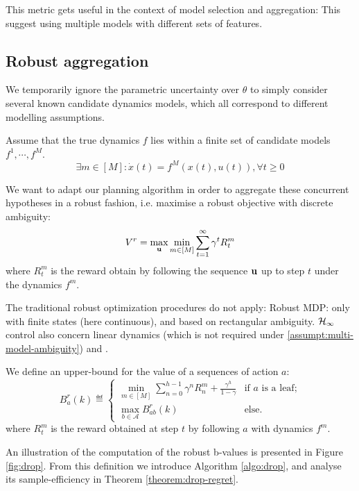 \documentclass{article}
\begin{document}
This metric gets useful in the context of model selection and aggregation: 
This suggest using multiple models with different sets of features.

\subsection{Robust aggregation}

We temporarily ignore the parametric uncertainty over $\theta$ to simply consider several known candidate dynamics models, which all correspond to different modelling assumptions.

\begin{assumption}
\label{assumpt:multi-model-ambiguity}
Assume that the true dynamics $f$ lies within a finite set of candidate models $f^1, \cdots, f^M$.
\begin{equation}
\exists m\in[M]: \dot{x}(t) = f^M(x(t), u(t)), \forall t\geq 0
\end{equation}
\end{assumption}
We want to adapt our planning algorithm in order to aggregate these concurrent hypotheses in a robust fashion, i.e. maximise a robust objective with discrete ambiguity:
\[
V^r = \max_{\mathbf{u}}\min_{m\in[M]} \sum_{t=1}^\infty \gamma^t R_t^m
\]
where $R_t^m$ is the reward obtain by following the sequence $\mathbf{u}$ up to step $t$ under the dynamics $f^m$.

The traditional robust optimization procedures do not apply: Robust MDP: only with finite states (here continuous), and based on rectangular ambiguity. $\mathcal{H}_\infty$ control also concern linear dynamics (which is not required under \autoref{assumpt:multi-model-ambiguity}) and .


\begin{definition} We define an upper-bound for the value of a sequences of action $a$:
\begin{equation}
\label{eq:robust-b-values}
B_a^r(k)  \eqdef
\begin{cases}
\min_{m\in[M]} \sum_{n=0}^{h-1} \gamma^n R_n^m  + \frac{\gamma^h}{1-\gamma} &\text{if } a \text{ is a leaf;}\\
\max_{b\in\mathcal{A}} B_{ab}^r(k) & \text{else.}
\end{cases}
\end{equation}
where $R_t^m$ is the reward obtained at step $t$ by following $a$ with dynamics $f^m$.
\end{definition}
An illustration of the computation of the robust b-values is presented in Figure \ref{fig:drop}. From this definition we introduce Algorithm \ref{algo:drop}, and analyse its sample-efficiency in Theorem \ref{theorem:drop-regret}.
\end{document}
